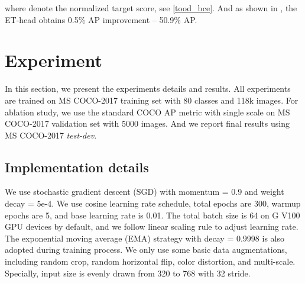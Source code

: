 \documentclass[final]{cvpr}
\begin{document}
where  denote the normalized target score, see \cref{tood_bce}. And as shown in , the ET-head obtains 0.5\% AP improvement -- 50.9\% AP.






\section{Experiment}



In this section, we present the experiments details and results. All experiments are trained on
MS COCO-2017 training set with 80 classes and 118k images. For ablation study, we use the standard COCO AP metric with single scale on MS COCO-2017 validation set with 5000 images. And we report final results using MS COCO-2017 \textit{test-dev}.

\subsection{Implementation details}

We use stochastic gradient descent (SGD) with momentum = 0.9 and weight decay = 5e-4. We use cosine learning rate schedule, total epochs are 300, warmup epochs are 5, and base learning rate is 0.01. The total batch size is 64 on  G V100 GPU devices by default, and we follow linear scaling rule\cite{linear-scale-rule} to adjust learning rate. The exponential moving average (EMA) strategy with decay = 0.9998 is also adopted during training process. We only use some basic data augmentations, including random crop, random horizontal flip, color distortion, and multi-scale. Specially, input size is evenly drawn from 320 to 768 with 32 stride.
\end{document}

